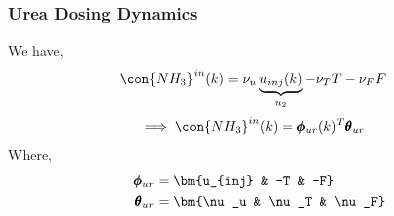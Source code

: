 \subsubsection{Urea Dosing Dynamics}
We have,
\begin{align*}
        \con{NH_3}^{in}(k) &= \nu_u \underbrace{u_{inj}(k)}_{u_2} - \nu_T T - \nu_F F
\end{align*}
\begin{align}
        \implies \con{NH_3}^{in}(k)  &= \pmb \phi_{ur}(k) ^T \pmb \theta_{ur}
\end{align}
Where,
\begin{align*}
        \pmb \phi_{ur} &= \bm{u_{inj} & -T & -F}\\
        \pmb \theta_{ur} &= \bm{\nu_u & \nu_T & \nu_F}
\end{align*}

